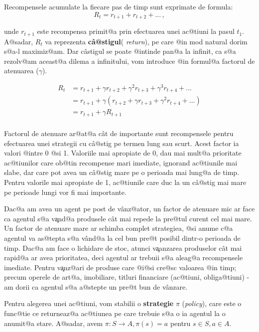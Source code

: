 Recompensele acumulate la fiecare pas de timp sunt exprimate de formula: 
\begin{equation}
	R_t = r_{t+1} + r_{t+2} + ... \,,
\end{equation}


\noindent unde $r_{t+1}$ este recompensa primit@a prin efectuarea unei ac@tiuni la pasul $t_1$. A@sadar, $R_t$ va reprezenta \textbf{c\^ a@stigul}( \textsl{return}), pe care @in mod natural dorim s@a-l maximiz@am. Dar c\^ astigul se poate @intinde pan@a la infinit, ca s@a rezolv@am aceast@a dilema a infinitului, vom introduce @in formul@a factorul de atenuarea ($\gamma$).


\begin{align}
	R_t & =  r_{t+1} + \gamma r_{t+2} + \gamma^{2} r_{t+3} + \gamma^{3} r_{t+4} + ... \\
	& =  r_{t+1} + \gamma \left( r_{t+2} + \gamma r_{t+3} + \gamma^{2} r_{t+4} + ...  \right) \\
	& =  r_{t+1} + \gamma R_{t+1} \\
\end{align}

Factorul de atenuare ar@at@a c\^ at de importante sunt recompensele pentru efectuarea unei strategii cu c\^ a@stig pe termen lung sau scurt. Acest factor ia valori @intre 0 @si 1. Valoriile mai apropiate de 0, dau mai mult@a prioritate ac@tiunilor care ob@tin recompense mari imediate, ignorand ac@tiunile mai slabe, dar care pot avea un c\^ a@stig mare pe o perioada mai lung@a de timp. Pentru valorile mai apropiate de 1, ac@tiunile care duc la un c\^ a@stig mai mare pe perioade lungi vor fi mai importante.

Dac@a am avea un agent pe post de v\^ anz@ator, un factor de atenuare mic ar face ca agentul s@a v{\c a}nd@a produsele c\^ at mai repede la pre@tul curent cel mai mare. Un factor de atenuare mare ar schimba complet strategiea, @si anume c@a agentul va as@tepta s@a v\^ and@a la cel bun pre@t posibil dintr-o perioada de timp. Dac@a am face o lichidare de stoc, atunci v{\c a}anzarea produselor c\^ at mai rapid@a ar avea prioritatea, deci agentul ar trebuii s@a aleag@a recompensele imediate. Pentru v{\c a}nz@ari de produse care @i@si cre@sc valoarea @in timp; precum operele de art@a, imobiliare, titluri financiare (ac@tiuni, obliga@tiuni) - am dorii ca agentul s@a a@stepte un pre@t bun de v\^ anzare.

Pentru alegerea unei ac@tiuni, vom stabilii o \textbf{strategie} $\pi$ (\textsl{policy}), care este o func@tie ce returneaz@a ac@tiunea pe care trebuie s@a o ia agentul la o anumit@a stare. A@sadar, avem $\pi: S \rightarrow A, \pi(s) = a $ pentru $ s \in S, a \in A$.

